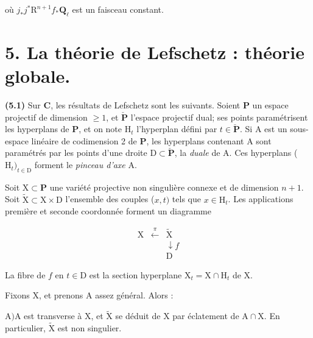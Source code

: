 \documentclass[10pt,leqno]{article}
\begin{document}
\noindent où \(j_{*}j^{*}\mathrm{R}^{n+1}f_{*}\mathbf{Q}_{\ell }\) est un faisceau constant.\par

\section*{5. La théorie de Lefschetz : théorie globale.}

\noindent \textbf{(5.1)} Sur \(\mathbf{C}\), les résultats de Lefschetz sont les suivants. Soient \(\mathbf{P}\) un espace projectif de dimension \(\geq 1\), et \(\check{\mathbf{P}}\) l’espace projectif dual; ses points paramétrisent les hyperplans de \(\mathbf{P}\), et on note \(\mathrm{H}_{t}\) l’hyperplan défini par \(t\in \check{\mathbf{P}}\). Si \(\mathrm{A}\) est un sous-espace linéaire de codimension 2 de \(\mathbf{P}\), les hyperplans contenant \(\mathrm{A}\) sont paramétrés par les points d’une droite \(\mathrm{D}\subset \check{\mathbf{P}}\), la \emph{duale} de \(\mathrm{A}\). Ces hyperplans (\(\mathrm{H}_{t})_{t\in \mathrm{D}}\) forment le \emph{pinceau d’axe} \(\mathrm{A}\).\par

\noindent Soit \(\mathrm{X}\subset \mathbf{P}\) une variété projective non singulière connexe et de dimension \(n+1\). Soit \(\widetilde{\mathrm{X}}\subset \mathrm{X}\times \mathrm{D}\) l’ensemble des couples (\(x,t)\) tels que \(x\in \mathrm{H}_{t}\). Les applications première et seconde coordonnée forment un diagramme\par

\[\begin{array}{ccc}\mathrm X&\xleftarrow{\pi}&\widetilde{\mathrm X}\\ &&\downarrow\!{f}\\ &&\mathrm D\end{array}\tag{5.1.1}\]

\noindent La fibre de \(f\) en \(t\in \mathrm{D}\) est la section hyperplane \(\mathrm{X}_{t}=\mathrm{X}\cap \mathrm{H}_{t}\) de \(\mathrm{X}\).\par

\clearpage

\label{physical-19}\par\smallskip

\noindent Fixons \(\mathrm{X}\), et prenons \(\mathrm{A}\) assez général. Alors :\par

\noindent \(\mathrm{A}) \mathrm{A}\) est transverse à \(\mathrm{X}\), et \(\widetilde{\mathrm{X}}\) se déduit de \(\mathrm{X}\) par éclatement de \(\mathrm{A}\cap \mathrm{X}\). En particulier, \(\widetilde{\mathrm{X}}\) est non singulier.\par
\end{document}
